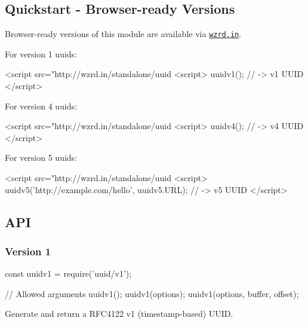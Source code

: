 \subsection*{Quickstart -\/ Browser-\/ready Versions}

Browser-\/ready versions of this module are available via \href{https://github.com/jfhbrook/wzrd.in}{\tt wzrd.\+in}.

For version 1 uuids\+:


\begin{DoxyCode}
<script src="http://wzrd.in/standalone/uuid%
<script>
uuidv1(); // -> v1 UUID
</script>
\end{DoxyCode}


For version 4 uuids\+:


\begin{DoxyCode}
<script src="http://wzrd.in/standalone/uuid%
<script>
uuidv4(); // -> v4 UUID
</script>
\end{DoxyCode}


For version 5 uuids\+:


\begin{DoxyCode}
<script src="http://wzrd.in/standalone/uuid%
<script>
uuidv5('http://example.com/hello', uuidv5.URL); // -> v5 UUID
</script>
\end{DoxyCode}


\subsection*{A\+PI}

\subsubsection*{Version 1}


\begin{DoxyCode}
const uuidv1 = require('uuid/v1');

// Allowed arguments
uuidv1();
uuidv1(options);
uuidv1(options, buffer, offset);
\end{DoxyCode}


Generate and return a R\+F\+C4122 v1 (timestamp-\/based) U\+U\+ID.


